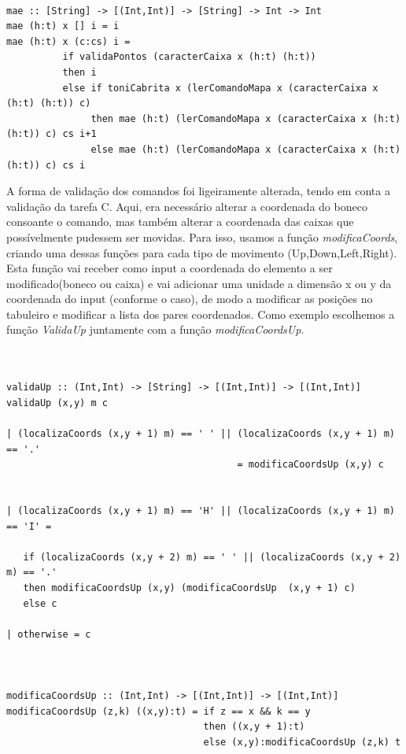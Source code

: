 \documentclass[a4paper]{article}
\begin{document}
\begin{Verbatim}

mae :: [String] -> [(Int,Int)] -> [String] -> Int -> Int 
mae (h:t) x [] i = i      
mae (h:t) x (c:cs) i = 
          if validaPontos (caracterCaixa x (h:t) (h:t))  
          then i 
          else if toniCabrita x (lerComandoMapa x (caracterCaixa x (h:t) (h:t)) c)
               then mae (h:t) (lerComandoMapa x (caracterCaixa x (h:t) (h:t)) c) cs i+1 
               else mae (h:t) (lerComandoMapa x (caracterCaixa x (h:t) (h:t)) c) cs i
\end{Verbatim}
\newpage

A forma de validação dos comandos foi ligeiramente alterada, tendo em conta a validação da tarefa C. Aqui, era necessário alterar a coordenada do boneco consoante o comando, mas também alterar a coordenada das caixas que possívelmente pudessem ser movidas. Para isso, usamos a função \textit{modificaCoords}, criando uma dessas funções para cada tipo de movimento (Up,Down,Left,Right). Esta função vai receber como input a coordenada do elemento a ser modificado(boneco ou caixa) e vai adicionar uma unidade a dimensão x ou y da coordenada do input (conforme o caso), de modo a modificar as posições no tabuleiro e modificar a lista dos pares coordenados. Como exemplo escolhemos a função \textit{ValidaUp} juntamente com a função \textit{modificaCoordsUp}. \par

\begin{Verbatim}


validaUp :: (Int,Int) -> [String] -> [(Int,Int)] -> [(Int,Int)]
validaUp (x,y) m c 

| (localizaCoords (x,y + 1) m) == ' ' || (localizaCoords (x,y + 1) m) == '.' 
                                         = modificaCoordsUp (x,y) c


| (localizaCoords (x,y + 1) m) == 'H' || (localizaCoords (x,y + 1) m) == 'I' = 
   
   if (localizaCoords (x,y + 2) m) == ' ' || (localizaCoords (x,y + 2) m) == '.'
   then modificaCoordsUp (x,y) (modificaCoordsUp  (x,y + 1) c)
   else c

| otherwise = c



modificaCoordsUp :: (Int,Int) -> [(Int,Int)] -> [(Int,Int)]
modificaCoordsUp (z,k) ((x,y):t) = if z == x && k == y 
                                   then ((x,y + 1):t) 
                                   else (x,y):modificaCoordsUp (z,k) t  


\end{Verbatim}
\newpage
\end{document}

